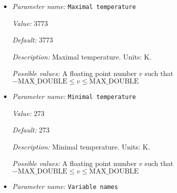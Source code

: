 \begin{itemize}
{\it Value:} 0


{\it Default:} 0


{\it Description:} The formula that denotes the function you want to evaluate for particular values of the independent variables. This expression may contain any of the usual operations such as addition or multiplication, as well as all of the common functions such as `sin' or `cos'. In addition, it may contain expressions like `if(x>0, 1, -1)' where the expression evaluates to the second argument if the first argument is true, and to the third argument otherwise. For a full overview of possible expressions accepted see the documentation of the muparser library at http://muparser.beltoforion.de/.

If the function you are describing represents a vector-valued function with multiple components, then separate the expressions for individual components by a semicolon.


{\it Possible values:} Any string
\item {\it Parameter name:} {\tt Maximal temperature}
\label{parameters:Boundary temperature model/Function/Maximal temperature}
\label{parameters:Boundary_20temperature_20model/Function/Maximal_20temperature}


{\it Value:} 3773


{\it Default:} 3773


{\it Description:} Maximal temperature. Units: K.


{\it Possible values:} A floating point number $v$ such that $-\text{MAX\_DOUBLE} \leq v \leq \text{MAX\_DOUBLE}$
\item {\it Parameter name:} {\tt Minimal temperature}
\label{parameters:Boundary temperature model/Function/Minimal temperature}
\label{parameters:Boundary_20temperature_20model/Function/Minimal_20temperature}


{\it Value:} 273


{\it Default:} 273


{\it Description:} Minimal temperature. Units: K.


{\it Possible values:} A floating point number $v$ such that $-\text{MAX\_DOUBLE} \leq v \leq \text{MAX\_DOUBLE}$
\item {\it Parameter name:} {\tt Variable names}
\label{parameters:Boundary temperature model/Function/Variable names}
\label{parameters:Boundary_20temperature_20model/Function/Variable_20names}



\end{itemize}

